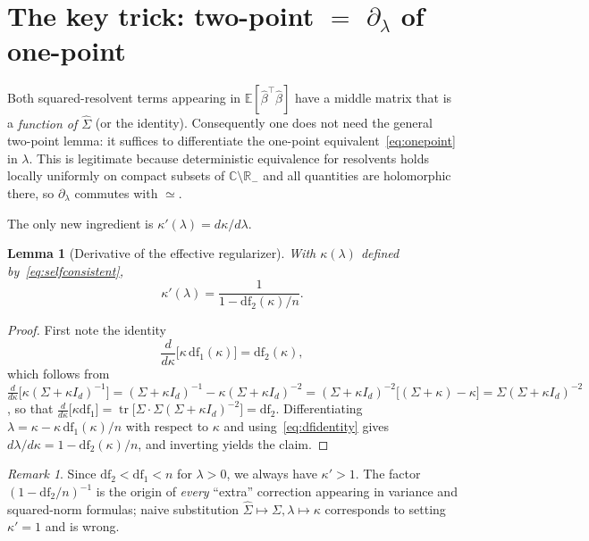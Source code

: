 \documentclass[11pt]{article}
\newcommand{\R}{\mathbb{R}}
\newcommand{\E}{\mathbb{E}}
\newcommand{\Tr}{\operatorname{tr}}
\newcommand{\Sig}{\Sigma}
\newcommand{\Sighat}{\hat{\Sigma}}
\newcommand{\bhat}{\hat{\beta}}
\newcommand{\Id}{I_{d}}
\newcommand{\dfone}{\mathrm{df}_{1}}
\newcommand{\dftwo}{\mathrm{df}_{2}}
\newcommand{\kap}{\kappa}
\newcommand{\kapp}{\kappa'}
\newcommand{\Sk}{(\Sig+\kap \Id)}
\newcommand{\deq}{\simeq}                %
\theoremstyle{plain}
\newtheorem{lemma}{Lemma}
\theoremstyle{remark}
\newtheorem{remark}{Remark}
\begin{document}
\section{The key trick: two-point $=$ $\partial_{\lambda}$ of one-point}

Both squared-resolvent terms appearing in $\E[\bhat^{\top}\bhat]$ have a middle matrix that is a
\emph{function of $\Sighat$} (or the identity). Consequently one does not need the general
two-point lemma: it suffices to differentiate the one-point equivalent~\eqref{eq:onepoint} in
$\lambda$. This is legitimate because deterministic equivalence for resolvents holds locally
uniformly on compact subsets of $\mathbb{C} \setminus \R_{-}$ and all quantities are holomorphic
there, so $\partial_{\lambda}$ commutes with $\deq$.

The only new ingredient is $\kapp(\lambda) = d\kap/d\lambda$.

\begin{lemma}[Derivative of the effective regularizer]
\label{lem:kappaprime}
With $\kap(\lambda)$ defined by~\eqref{eq:selfconsistent},
\begin{equation}
  \boxed{\;
  \kapp(\lambda) = \frac{1}{1 - \dftwo(\kap)/n}.
  \;}
\end{equation}
\end{lemma}

\begin{proof}
First note the identity
\begin{equation}
  \label{eq:dfidentity}
  \frac{d}{d\kap} \big[ \kap\, \dfone(\kap) \big] = \dftwo(\kap),
\end{equation}
which follows from
$\frac{d}{d\kap}\big[ \kap \Sk^{-1} \big] = \Sk^{-1} - \kap \Sk^{-2}
= \Sk^{-2}\big[ (\Sig + \kap) - \kap \big] = \Sig \Sk^{-2}$,
so that
$\frac{d}{d\kap}\big[\kap \dfone\big] = \Tr\!\big[ \Sig \cdot \Sig \Sk^{-2} \big] = \dftwo$.
Differentiating $\lambda = \kap - \kap\,\dfone(\kap)/n$ with respect to $\kap$ and
using~\eqref{eq:dfidentity} gives $d\lambda/d\kap = 1 - \dftwo(\kap)/n$, and inverting yields the claim.
\end{proof}

\begin{remark}
Since $\dftwo < \dfone < n$ for $\lambda > 0$, we always have $\kapp > 1$. The factor
$(1 - \dftwo/n)^{-1}$ is the origin of \emph{every} ``extra'' correction appearing in
variance and squared-norm formulas; naive substitution
$\Sighat \mapsto \Sig, \lambda \mapsto \kap$ corresponds to setting $\kapp = 1$ and is wrong.
\end{remark}
\end{document}
